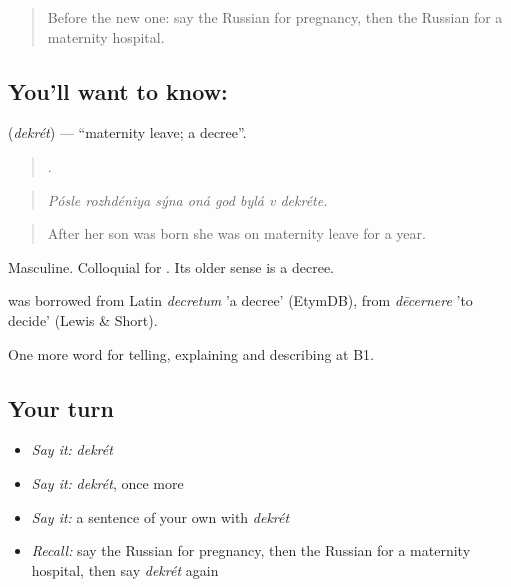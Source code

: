 \label{lesson:RU-C495-dekret}



\begin{quote}
Before the new one: say the Russian for pregnancy, then the Russian for a maternity hospital.
\end{quote}

\subsection*{You'll want to know: }
\textbf{} (\emph{dekrét}) — \textquotedblleft{}maternity leave; a decree\textquotedblright{}.

\begin{quote}
       .
\end{quote}

\begin{quote}
\emph{Pósle rozhdéniya sýna oná god bylá v dekréte.}
\end{quote}

\begin{quote}
After her son was born she was on maternity leave for a year.
\end{quote}

Masculine. Colloquial for \emph{ }. Its older sense is a decree.

\begin{cousinweb}
\emph{} was borrowed from Latin \emph{decretum} 'a decree' (EtymDB), from \emph{dēcernere} 'to decide' (Lewis \& Short).
\end{cousinweb}

\begin{grammarlens}[title={What you've built}]
One more word for telling, explaining and describing at B1.
\end{grammarlens}

\subsection*{Your turn}
\begin{itemize}
\raggedright
  \item \emph{Say it:} \emph{dekrét}
  \item \emph{Say it:} \emph{dekrét}, once more
  \item \emph{Say it:} a sentence of your own with \emph{dekrét}
  \item \emph{Recall:} say the Russian for pregnancy, then the Russian for a maternity hospital, then say \emph{dekrét} again
\end{itemize}

